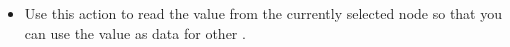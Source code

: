
\begin{itemize}
\item Use this action to read the value from the currently selected node so that you can use the value as data for other \gdsteps{}. 
\end{itemize}
